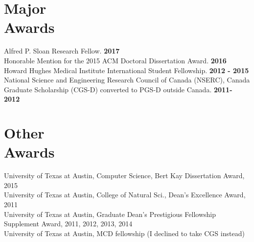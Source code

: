 \documentclass[margin,line,letterpaper]{resume}
\begin{document}
\begin{resume}

    \section{\mysidestyle Major \\Awards}
    Alfred P. Sloan Research Fellow.\hfill \textbf{ 2017}\vspace{2mm}\\
    Honorable Mention for the 2015 ACM Doctoral Dissertation Award.\hfill \textbf{ 2016}\vspace{2mm}\\
     Howard Hughes Medical Institute International Student Fellowship. \hfill \textbf{2012 - 2015}\vspace{2mm}
     \\ National Science and Engineering Research Council of Canada (NSERC), 
     Canada Graduate Scholarship (CGS-D) converted to PGS-D outside Canada. \hfill \textbf{2011- 2012} 
     
     \section {\mysidestyle Other \\Awards}
     University of Texas at Austin, Computer Science, Bert Kay Dissertation Award, 2015\vspace{2mm}\\
     University of Texas at Austin, College of Natural Sci., Dean's Excellence Award, 2011\vspace{2mm}\\
     University of Texas at Austin, Graduate Dean's Prestigious Fellowship Supplement Award, 2011, 2012, 2013, 2014 \vspace{2mm}
          \\ University of Texas at Austin, MCD fellowship (I declined to take CGS instead)
    

\end{resume}
\end{document}
